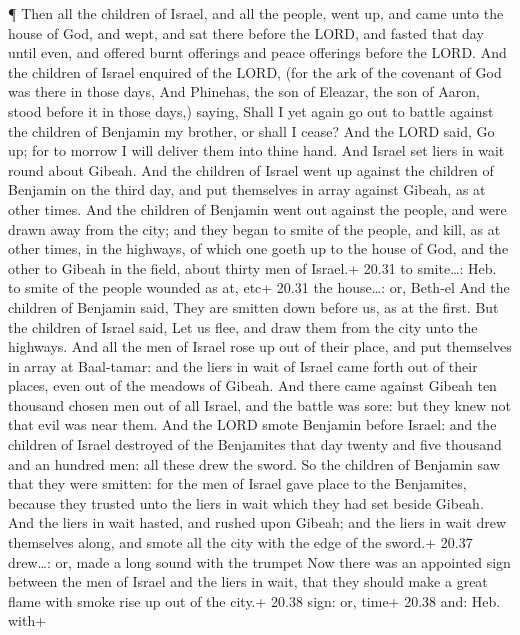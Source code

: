  ¶ Then all the children of Israel, and all the people,
went up, and came unto the house of God, and wept, and sat there before
the LORD, and fasted that day until even, and offered burnt offerings
and peace offerings before the LORD.  And the children of
Israel enquired of the LORD, (for the ark of the covenant of God was
there in those days,  And Phinehas, the son of Eleazar, the
son of Aaron, stood before it in those days,) saying, Shall I yet again
go out to battle against the children of Benjamin my brother, or shall I
cease? And the LORD said, Go up; for to morrow I will deliver them into
thine hand.  And Israel set liers in wait round about
Gibeah.  And the children of Israel went up against the
children of Benjamin on the third day, and put themselves in array
against Gibeah, as at other times.  And the children of
Benjamin went out against the people, and were drawn away from the city;
and they began to smite of the people, and kill, as at other times, in
the highways, of which one goeth up to the house of God, and the other
to Gibeah in the field, about thirty men of Israel.+ 20.31 to
smite\ldots: Heb. to smite of the people wounded as at, etc+ 20.31 the
house\ldots: or, Beth-el  And the children of Benjamin
said, They are smitten down before us, as at the first. But the children
of Israel said, Let us flee, and draw them from the city unto the
highways.  And all the men of Israel rose up out of their
place, and put themselves in array at Baal-tamar: and the liers in wait
of Israel came forth out of their places, even out of the meadows of
Gibeah.  And there came against Gibeah ten thousand chosen
men out of all Israel, and the battle was sore: but they knew not that
evil was near them.  And the LORD smote Benjamin before
Israel: and the children of Israel destroyed of the Benjamites that day
twenty and five thousand and an hundred men: all these drew the sword.
 So the children of Benjamin saw that they were smitten:
for the men of Israel gave place to the Benjamites, because they trusted
unto the liers in wait which they had set beside Gibeah. 
And the liers in wait hasted, and rushed upon Gibeah; and the liers in
wait drew themselves along, and smote all the city with the edge of the
sword.+ 20.37 drew\ldots: or, made a long sound with the trumpet
 Now there was an appointed sign between the men of Israel
and the liers in wait, that they should make a great flame with smoke
rise up out of the city.+ 20.38 sign: or, time+ 20.38 and: Heb. with+

